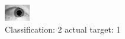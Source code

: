 \begin{figure}[h!]
\begin{center}
\includegraphics[width=0.60\columnwidth]{figures/ID1463_class_2_target_1.png}
\end{center}
\caption{ Classification: 2 actual target: 1}
\label{fig:ID1463_class_2_target_1}
\end{figure}

